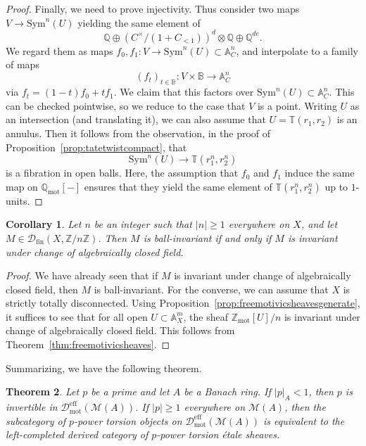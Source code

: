 \documentclass[11pt]{amsart}
\numberwithin{equation}{section}
\newtheorem{theorem}{Theorem}
\numberwithin{theorem}{section}
\newtheorem{corollary}[theorem]{Corollary}
\theoremstyle{definition}
\begin{document}
\begin{proof}
Finally, we need to prove injectivity. Thus consider two maps $V\to \mathrm{Sym}^n(U)$ yielding the same element of
\[
\mathbb Q\oplus (C^\times/(1+C_{<1}))^d\otimes \mathbb Q\oplus \mathbb Q^{de}.
\]
We regard them as maps $f_0,f_1: V\to \mathrm{Sym}^n(U)\subset \mathbb A^n_C$, and interpolate to a family of maps
\[
(f_t)_{t\in \mathbb B}: V\times \mathbb B\to \mathbb A^n_C
\]
via $f_t = (1-t)f_0 + tf_1$. We claim that this factors over $\mathrm{Sym}^n(U)\subset \mathbb A^n_C$. This can be checked pointwise, so we reduce to the case that $V$ is a point. Writing $U$ as an intersection (and translating it), we can also assume that $U = \mathbb T(r_1,r_2)$ is an annulus. Then it follows from the observation, in the proof of Proposition~\ref{prop:tatetwistcompact}, that
\[
\mathrm{Sym}^n(U)\to \mathbb T(r_1^n,r_2^n)
\]
is a fibration in open balls. Here, the assumption that $f_0$ and $f_1$ induce the same map on $\mathbb Q_{\mathrm{mot}}[-]$ ensures that they yield the same element of $\mathbb T(r_1^n,r_2^n)$ up to $1$-units.
\end{proof}


\begin{corollary} Let $n$ be an integer such that $|n|\geq 1$ everywhere on $X$, and let $M\in \mathcal D_{\mathrm{fin}}(X,\mathbb Z/n\mathbb Z)$. Then $M$ is ball-invariant if and only if $M$ is invariant under change of algebraically closed field.
\end{corollary}

\begin{proof} We have already seen that if $M$ is invariant under change of algebraically closed field, then $M$ is ball-invariant. For the converse, we can assume that $X$ is strictly totally disconnected. Using Proposition~\ref{prop:freemotivicsheavesgenerate}, it suffices to see that for all open $U\subset \mathbb A^m_X$, the sheaf $\mathbb Z_{\mathrm{mot}}[U]/n$ is invariant under change of algebraically closed field. This follows from Theorem~\ref{thm:freemotivicsheaves}.
\end{proof}

Summarizing, we have the following theorem.

\begin{theorem} Let $p$ be a prime and let $A$ be a Banach ring. If $|p|_A<1$, then $p$ is invertible in $\mathcal D_{\mathrm{mot}}^{\mathrm{eff}}(\mathcal M(A))$. If $|p|\geq 1$ everywhere on $\mathcal M(A)$, then the subcategory of $p$-power torsion objects on $\mathcal D_{\mathrm{mot}}^{\mathrm{eff}}(\mathcal M(A))$ is equivalent to the left-completed derived category of $p$-power torsion \'etale sheaves.
\end{theorem}
\end{document}
